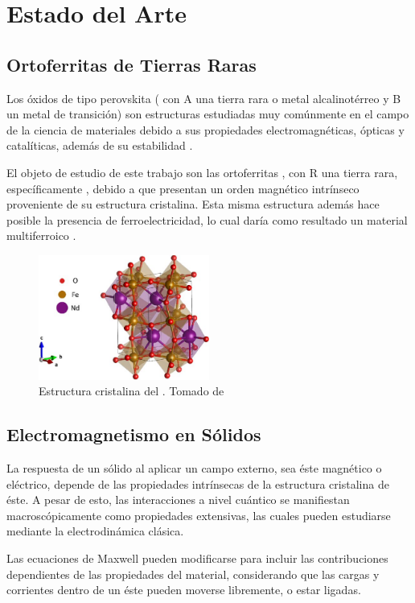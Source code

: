 \documentclass[../main.tex]{subfiles}
\begin{document}
\chapter{Estado del Arte}
\section{Ortoferritas de Tierras Raras}
Los óxidos de tipo perovskita ( con A una tierra rara o metal alcalinotérreo y B un metal de transición) son estructuras estudiadas muy comúnmente en el campo de la ciencia de materiales debido a sus propiedades electromagnéticas, ópticas y catalíticas, además de su estabilidad \cite{Wang2019}.

El objeto de estudio de este trabajo son las ortoferritas , con R una tierra rara, específicamente , debido a que presentan un orden magnético intrínseco proveniente de su estructura cristalina. Esta misma estructura además hace posible la presencia de ferroelectricidad, lo cual daría como resultado un material multiferroico \cite{Sharma2024}.
\begin{figure}[H]
    \centering
    \includegraphics[width=0.5\textwidth]{fig/estructuraNd.jpg}
    \caption{Estructura cristalina del \neod{}. Tomado de \cite{Quionero2021}}
    \label{fig:estructNd}
\end{figure}

\section{Electromagnetismo en Sólidos}
La respuesta de un sólido al aplicar un campo externo, sea éste magnético o eléctrico, depende de las propiedades intrínsecas de la estructura cristalina de éste. A pesar de esto, las interacciones a nivel cuántico se manifiestan macroscópicamente como propiedades extensivas, las cuales pueden estudiarse mediante la electrodinámica clásica.

Las ecuaciones de Maxwell pueden modificarse para incluir las contribuciones dependientes de las propiedades del material, considerando que las cargas y corrientes dentro de un éste pueden moverse libremente, o estar ligadas.
\end{document}
